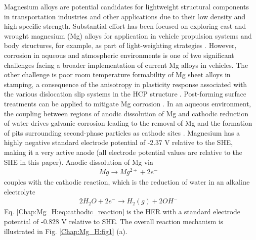 Magnesium alloys are potential candidates for lightweight structural components in transportation industries and other applications due to their low density and high specific strength. Substantial effort has been focused on exploring cast and wrought magnesium (Mg) alloys for application in vehicle propulsion systems and body structures, for example, as part of light-weighting strategies \cite{luo2005development, luo2006wrought,carter2011structural, jekl2015development, luo2013magnesium}. However, corrosion in aqueous and atmospheric environments is one of two significant challenges facing a broader implementation of current Mg alloys in vehicles. The other challenge is poor room temperature formability of Mg sheet alloys in stamping, a consequence of the anisotropy in plasticity response associated with the various dislocation slip systems in the \ac{HCP} structure \cite{yasi2010first}. Post-forming surface treatments can be applied to mitigate Mg corrosion \cite{zheng2005corrosion}.
In an aqueous environment, the coupling between regions of anodic dissolution of Mg and cathodic reduction of water drives galvanic corrosion leading to the removal of Mg and the formation of pits surrounding second-phase particles as cathode sites \cite{birbilis2014evidence, zeng2006review}. Magnesium has a highly negative standard electrode potential of -2.37 V relative to the \ac{SHE}, making it a very active anode (all electrode potential values are relative to the \ac{SHE} in this paper). Anodic dissolution of Mg via
\begin{align}
Mg \rightarrow Mg^{2+} + 2e^{-}
 \label{Chap:Mg_H:eq:anodic_dissolution}
\end{align}
couples with the cathodic reaction, which is the reduction of water in an alkaline electrolyte
\begin{align}
2H_2O + 2e^{-} \rightarrow H_{2}(g) + 2OH^{-}
 \label{Chap:Mg_H:eq:cathodic_reaction}
\end{align}
Eq. \ref{Chap:Mg_H:eq:cathodic_reaction} is the \ac{HER} with a standard electrode potential of -0.828 V relative to \ac{SHE}. The overall reaction mechanism is illustrated in Fig. \ref{Chap:Mg_H:fig1} (a).

